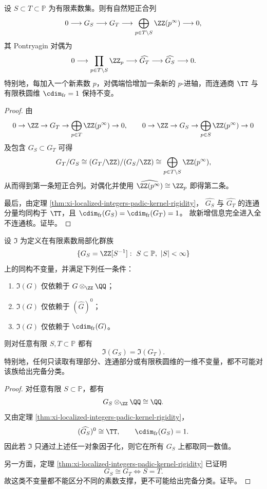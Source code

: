 \begin{corollary}[有限局部化塔的逐素数增量律]\label{cor:xi-localized-integers-prime-axis-increment-law}
设 \(S\subset T\subset\mathbb P\) 为有限素数集。则有自然短正合列
\[
0\longrightarrow G_S\longrightarrow G_T\longrightarrow
\bigoplus_{p\in T\setminus S}\ZZ(p^\infty)\longrightarrow 0,
\]
其 Pontryagin 对偶为
\[
0\longrightarrow \prod_{p\in T\setminus S}\ZZ_p
\longrightarrow \widehat{G_T}
\longrightarrow \widehat{G_S}
\longrightarrow 0.
\]
特别地，每加入一个新素数 \(p\)，对偶端恰增加一条新的 \(p\)-进轴，而连通商
\(\TT\) 与有限秩圆维 \(\cdim_{\mathrm{fr}}=1\) 保持不变。
\end{corollary}
\begin{proof}
由
\[
0\to \ZZ\to G_T\to \bigoplus_{p\in T}\ZZ(p^\infty)\to 0,
\qquad
0\to \ZZ\to G_S\to \bigoplus_{p\in S}\ZZ(p^\infty)\to 0
\]
及包含 \(G_S\subset G_T\) 可得
\[
G_T/G_S
\cong
(G_T/\ZZ)/(G_S/\ZZ)
\cong
\bigoplus_{p\in T\setminus S}\ZZ(p^\infty),
\]
从而得到第一条短正合列。对偶化并使用
\(
\widehat{\ZZ(p^\infty)}\cong \ZZ_p
\)
即得第二条。

最后，由定理 \ref{thm:xi-localized-integers-padic-kernel-rigidity}，
\(\widehat{G_S}\) 与 \(\widehat{G_T}\) 的连通分量均同构于 \(\TT\)，且
\(\cdim_{\mathrm{fr}}(G_S)=\cdim_{\mathrm{fr}}(G_T)=1\)。
故新增信息完全进入全不连通核。证毕。
\end{proof}

\begin{theorem}[连通与有理不变量的统一不可区分性]\label{thm:xi-localized-integers-connected-rational-blindness}
设 \(\mathfrak I\) 为定义在有限素数局部化群族
\[
\{G_S=\ZZ[S^{-1}]:\ S\subset\mathbb P,\ |S|<\infty\}
\]
上的同构不变量，并满足下列任一条件：
\begin{enumerate}
  \item \(\mathfrak I(G)\) 仅依赖于 \(G\otimes_{\ZZ}\QQ\)；
  \item \(\mathfrak I(G)\) 仅依赖于 \((\widehat G)^0\)；
  \item \(\mathfrak I(G)\) 仅依赖于 \(\cdim_{\mathrm{fr}}(G)\)。
\end{enumerate}
则对任意有限 \(S,T\subset\mathbb P\) 都有
\[
\mathfrak I(G_S)=\mathfrak I(G_T).
\]
特别地，任何只读取有理部分、连通部分或有限秩圆维的一维不变量，都不可能对该族给出完备分类。
\end{theorem}
\begin{proof}
对任意有限 \(S\subset\mathbb P\)，都有
\[
G_S\otimes_{\ZZ}\QQ\cong \QQ.
\]
又由定理 \ref{thm:xi-localized-integers-padic-kernel-rigidity}，
\[
(\widehat{G_S})^0\cong \TT,
\qquad
\cdim_{\mathrm{fr}}(G_S)=1.
\]
因此若 \(\mathfrak I\) 只通过上述任一对象因子化，则它在所有 \(G_S\) 上都取同一数值。

另一方面，定理 \ref{thm:xi-localized-integers-padic-kernel-rigidity} 已证明
\[
G_S\cong G_T
\iff
S=T.
\]
故这类不变量都不能区分不同的素数支撑，更不可能给出完备分类。证毕。
\end{proof}



\endinput
